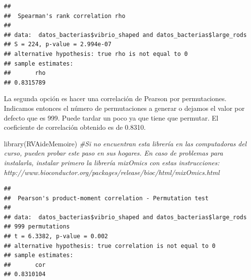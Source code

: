 \documentclass[
]{book}
\newenvironment{Shaded}{\begin{snugshade}}{\end{snugshade}}
\newcommand{\AttributeTok}[1]{\textcolor[rgb]{0.77,0.63,0.00}{#1}}
\newcommand{\CommentTok}[1]{\textcolor[rgb]{0.56,0.35,0.01}{\textit{#1}}}
\newcommand{\ConstantTok}[1]{\textcolor[rgb]{0.00,0.00,0.00}{#1}}
\newcommand{\FunctionTok}[1]{\textcolor[rgb]{0.00,0.00,0.00}{#1}}
\newcommand{\NormalTok}[1]{#1}
\newcommand{\SpecialCharTok}[1]{\textcolor[rgb]{0.00,0.00,0.00}{#1}}
\newcommand{\StringTok}[1]{\textcolor[rgb]{0.31,0.60,0.02}{#1}}
\begin{document}
\begin{Shaded}
\end{Shaded}

\begin{verbatim}
## 
##  Spearman's rank correlation rho
## 
## data:  datos_bacterias$vibrio_shaped and datos_bacterias$large_rods
## S = 224, p-value = 2.994e-07
## alternative hypothesis: true rho is not equal to 0
## sample estimates:
##       rho 
## 0.8315789
\end{verbatim}

La segunda opción es hacer una correlación de Pearson por permutaciones. Indicamos entonces el número de permutaciones a generar o dejamos el valor por defecto que es 999. Puede tardar un poco ya que tiene que permutar. El coeficiente de correlación obtenido es de 0.8310.

\begin{Shaded}
\begin{Highlighting}[]
\FunctionTok{library}\NormalTok{(RVAideMemoire) }\CommentTok{\#Si no encuentran esta librería en las computadoras del curso, pueden probar este paso en sus hogares. En caso de problemas para instalarla, instalar primero la librería mixOmics con estas instrucciones: http://www.bioconductor.org/packages/release/bioc/html/mixOmics.html  }
\end{Highlighting}
\end{Shaded}

\begin{Shaded}
\end{Shaded}

\begin{verbatim}
## 
##  Pearson's product-moment correlation - Permutation test
## 
## data:  datos_bacterias$vibrio_shaped and datos_bacterias$large_rods
## 999 permutations
## t = 6.3382, p-value = 0.002
## alternative hypothesis: true correlation is not equal to 0
## sample estimates:
##       cor 
## 0.8310104
\end{verbatim}
\end{document}
